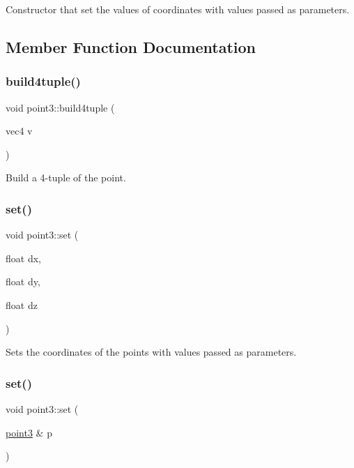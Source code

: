 Constructor that set the values of coordinates with values passed as parameters. 



\subsection{Member Function Documentation}
\hypertarget{classpoint3_a88989a386ad528f15a04114b5a59173f}{}\label{classpoint3_a88989a386ad528f15a04114b5a59173f} 
\subsubsection{\texorpdfstring{build4tuple()}{build4tuple()}}
{\footnotesize\ttfamily void point3\+::build4tuple (\begin{DoxyParamCaption}\item[{vec4}]{v }\end{DoxyParamCaption})}



Build a 4-\/tuple of the point. 

\hypertarget{classpoint3_ac841fa40083190786715cea25a7485de}{}\label{classpoint3_ac841fa40083190786715cea25a7485de} 
\subsubsection{\texorpdfstring{set()}{set()}\hspace{0.1cm}{\footnotesize\ttfamily [1/2]}}
{\footnotesize\ttfamily void point3\+::set (\begin{DoxyParamCaption}\item[{float}]{dx,  }\item[{float}]{dy,  }\item[{float}]{dz }\end{DoxyParamCaption})}



Sets the coordinates of the points with values passed as parameters. 

\hypertarget{classpoint3_ae4720a1b5d2f9726015cff44948d3611}{}\label{classpoint3_ae4720a1b5d2f9726015cff44948d3611} 
\subsubsection{\texorpdfstring{set()}{set()}\hspace{0.1cm}{\footnotesize\ttfamily [2/2]}}
{\footnotesize\ttfamily void point3\+::set (\begin{DoxyParamCaption}\item[{\hyperlink{classpoint3}{point3} \&}]{p }\end{DoxyParamCaption})}



